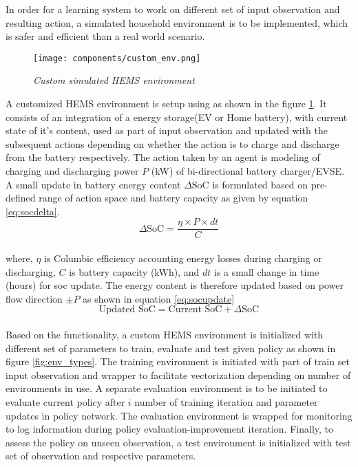 \begin{large}
In order for a learning system to work on different set of input observation and resulting action, a simulated household environment is to be implemented, which is safer and efficient than a real world scenario. \\

\begin{figure}[h]
	\begin{center}
		\texttt{[image: components/custom\_env.png]}
		\caption{ \textit{Custom simulated HEMS environment} }
		\label{fig:custom_env}
	\end{center}
\end{figure}

A customized HEMS environment is setup using \cite{gymnasium} as shown in the figure \ref{fig:custom_env}. It consists of an integration of a energy storage(EV or Home battery), with current state of it's content, used as part of input observation and updated with the subsequent actions depending on whether the action is to charge and discharge from the battery respectively. The action taken by an agent is modeling of charging and discharging power $P$ (kW) of bi-directional battery charger/EVSE. A small update in battery energy content $\Delta \text{SoC}$ is formulated based on pre-defined range of action space and battery capacity as given by equation \ref{eq:socdelta}. \\


\begin{equation}
	\boxed{
		\Delta \text{SoC} = \frac{\eta \times P \times dt}{C} 
	}
	\label{eq:socdelta}
	\tag{1}
\end{equation} \\


where, $\eta$ is Columbic efficiency accounting energy losses during charging or discharging, $C$ is battery capacity (kWh), and $dt$ is a small change in time (hours) for soc update. The energy content is therefore updated based on power flow direction $\pm P$ as shown in equation \ref{eq:socupdate} \\

\begin{equation}
	\boxed{
		\text{Updated SoC}  = \text{Current SoC} + \Delta \text{SoC} 
	}
	\label{eq:socupdate}
	\tag{2}
\end{equation} \\

Based on the functionality, a custom HEMS environment is initialized with different set of parameters to train, evaluate and test given policy as shown in figure \ref{fig:env_types}. The training environment is initiated with part of train set input observation and wrapper to facilitate vectorization depending on number of environments in use. A separate evaluation environment is to be initiated to evaluate current policy after $i$ number of training iteration and parameter updates in policy network. The evaluation environment is wrapped for monitoring to log information during policy evaluation-improvement iteration. Finally, to assess the policy on unseen observation, a test environment is initialized with test set of observation and respective parameters. \\


\end{large}
